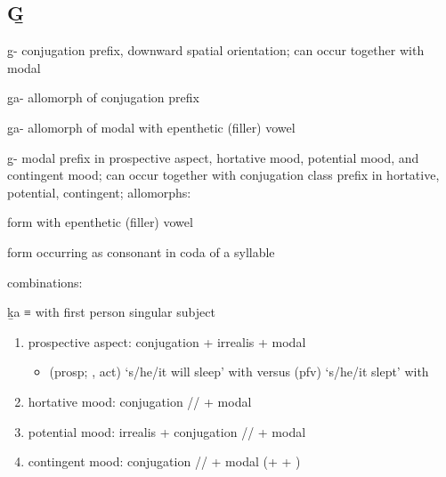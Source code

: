 \subsection{G̱}\label{sec:alphalist-gh}
\begin{morphdesc}[resume*=alphalist]
\item[g̱-]\label{m:g̱-conj}
	 conjugation prefix, downward spatial orientation;
	can occur together with modal 

\item[g̱a-]\label{m:g̱a-conj}
	allomorph of  conjugation prefix 

\item[g̱a-]\label{m:g̱a-mod}
	allomorph of modal  with epenthetic (filler) vowel 

\item[g̱-]\label{m:g̱-mod}
	modal prefix in prospective aspect,
		hortative mood,
		potential mood,
		and contingent mood;
	can occur together with  conjugation class prefix in hortative, potential, contingent;
	\newline
	allomorphs:
	\begin{allolist}
	\item[{\X[g̱a-mod]{g̱a-}}]
			form with epenthetic (filler) vowel 
	\item[{\X[x̱-g̱cnj]{x̱-}}]
			form occurring as consonant in coda of a syllable
	\end{allolist}
	combinations:
	\begin{allolist}
	\item[ḵa]	≡  with first person singular subject \fm{x̱a-}
	\end{allolist}
	\begin{enumerate}
	\item	prospective aspect:
			conjugation 
			+ irrealis 
			+ modal 
		\begin{itemize}
		\item	{} (prosp; ,  act) ‘s/he/it will sleep’
				with \newline
			versus  (pfv) ‘s/he/it slept’
				with 
		\end{itemize}
	\item	hortative mood:
			conjugation //
			+  modal 
	\item	potential mood:
			irrealis 
			+ conjugation //
			+ modal 
	\item	contingent mood:
			conjugation //
			+ modal 
			(+  + )
	\end{enumerate}


\end{morphdesc}
